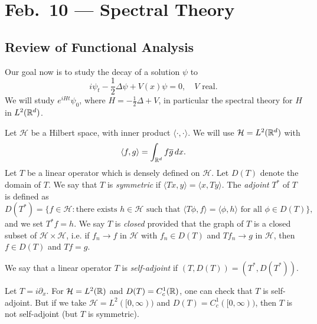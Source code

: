 \chapter{Feb.~10 --- Spectral Theory}

\section{Review of Functional Analysis}

\begin{remark}
  Our goal now is to study the decay of a solution $\psi$ to
  \[
    i\psi_t - \frac{1}{2} \Delta \psi + V(x) \psi = 0, \quad \text{$V$ real}.
  \]
  We will study $e^{iHt} \psi_0$, where
  $H = -\frac{1}{2} \Delta + V$, in particular the
  spectral theory for $H$ in $L^2(\mathbb{R}^d)$.
\end{remark}

\begin{definition}
  Let $\mathcal{H}$ be a Hilbert space, with inner product
  $\langle \cdot, \cdot \rangle$. We will
  use $\mathcal{H} = L^2(\mathbb{R}^d)$ with
  \[
    \langle f, g \rangle
    = \int_{\mathbb{R}^d} f \overline{g}\, dx.
  \]
  Let $T$ be a linear operator which is densely defined
  on $\mathcal{H}$.
  Let $D(T)$ denote the domain of $T$. We say that
  $T$ is \emph{symmetric} if
  $\langle Tx, y \rangle = \langle x, Ty \rangle$.
  The \emph{adjoint} $T^*$ of $T$ is defined as
  \[
    D(T^*) =
    \{
      f \in \mathcal{H} : \text{there exists $h \in \mathcal{H}$ such that } \langle T \phi, f \rangle = \langle \phi, h \rangle \text{ for all $\phi \in D(T)$}
    \},
  \]
  and we set $T^* f = h$. We say
  $T$ is \emph{closed} provided that the graph
  of $T$ is a closed subset of $\mathcal{H} \times \mathcal{H}$,
  i.e. if $f_n \to f$ in $\mathcal{H}$ with $f_n \in D(T)$
  and $Tf_n \to g$ in $\mathcal{H}$, then
  $f \in D(T)$ and $Tf = g$.
\end{definition}

\begin{definition}
  We say that a linear operator $T$ is \emph{self-adjoint} if
  $(T, D(T)) = (T^*, D(T^*))$.
\end{definition}

\begin{example}
  Let $T = i \partial_x$. For $\mathcal{H} = L^2(\mathbb{R})$ and
  $D(T) = C^1_c(\mathbb{R})$, one can check that $T$ is self-adjoint.
  But if we take $\mathcal{H} = L^2([0, \infty))$ and
  $D(T) = C^1_c([0, \infty))$, then $T$ is not self-adjoint
  (but $T$ is symmetric).
\end{example}

